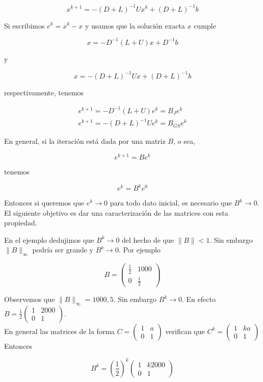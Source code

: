 \documentclass[10pt]{book}
\begin{document}
$$
x^{k+1}=-(D+L)^{-1} U x^{k}+(D+L)^{-1} b
$$

Si escribimos $e^{k}=x^{k}-x$ y usamos que la solución exacta $x$ cumple

$$
x=-D^{-1}(L+U) x+D^{-1} b
$$

y

$$
x=-(D+L)^{-1} U x+(D+L)^{-1} b
$$

respectivamente, tenemos

$$
\begin{gathered}
e^{k+1}=-D^{-1}(L+U) e^{k}=B_{J} e^{k} \\
e^{k+1}=-(D+L)^{-1} U e^{k}=B_{G S} e^{k}
\end{gathered}
$$

En general, si la iteración está dada por una matriz $B$, o sea,

$$
e^{k+1}=B e^{k}
$$

tenemos

$$
e^{k}=B^{k} e^{0}
$$

Entonces si queremos que $e^{k} \rightarrow 0$ para todo dato inicial, es necesario que $B^{k} \rightarrow 0$. El siguiente objetivo es dar una caracterización de las matrices con esta propiedad.

En el ejemplo dedujimos que $B^{k} \rightarrow 0$ del hecho de que $\|B\|<1$. Sin embargo $\|B\|_{\infty}$ podría ser grande y $B^{k} \rightarrow 0$. Por ejemplo

$$
B=\left(\begin{array}{cc}
\frac{1}{2} & 1000 \\
0 & \frac{1}{2}
\end{array}\right)
$$

Observemos que $\|B\|_{\infty}=1000,5$. Sin embargo $B^{k} \rightarrow 0$. En efecto $B=\frac{1}{2}\left(\begin{array}{cc}1 & 2000 \\ 0 & 1\end{array}\right)$.\\
En general las matrices de la forma $C=\left(\begin{array}{cc}1 & a \\ 0 & 1\end{array}\right)$ verifican que $C^{k}=\left(\begin{array}{cc}1 & k a \\ 0 & 1\end{array}\right)$\\
Entonces

$$
B^{k}=\left(\frac{1}{2}\right)^{k}\left(\begin{array}{cc}
1 & k 2000 \\
0 & 1
\end{array}\right)
$$
\end{document}
